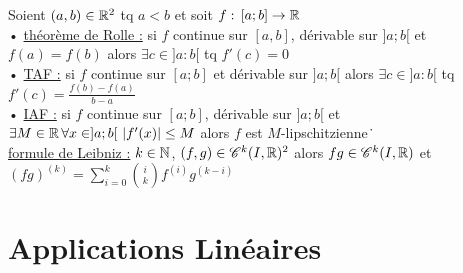 \documentclass[12 pt]{book}
\begin{document}
\begin{flushleft}
\begin{doublespace}
	Soient $(a,b)\in \mathbb{R}^2$ tq $a<b$ et soit $f : \, [a ; b] \rightarrow \mathbb{R}$\\
	• \underline{théorème de Rolle :} si $f$ continue sur $[a , b]$, dérivable sur $]a ; b[$ et $f(a) = f(b)$ alors $\exists c\in ]a : b[$ tq $f'(c) = 0$\\
	• \underline{TAF :} si $f$ continue sur $[a ; b]$ et dérivable sur $]a ; b[$ alors $\exists c\in ]a : b[$ tq $f'(c) = \frac{f(b) - f(a)}{b - a}$\\
	• \underline{IAF :} si $f$ continue sur $[a ; b]$, dérivable sur $]a ; b[$ et $\exists M \in \R \, \forall x\in ]a ; b[ \ |f'(x)|\leq M$ alors $f$ est $M$-lipschitzienne\.\
	\text{ }\\
	\underline{formule de Leibniz :} $k\in\mathbb{N}$, $(f,g)\in \mathscr{C}^k(I,\mathbb{R})^2$ alors $fg\in \mathscr{C}^k(I,\mathbb{R})$ et $(fg)^{(k)} = \sum_{i = 0}^k \binom{i}{k} f^{(i)} g^{(k - i)}$\\

\end{doublespace}
\end{flushleft}

\section*{Applications Linéaires}
\end{document}
